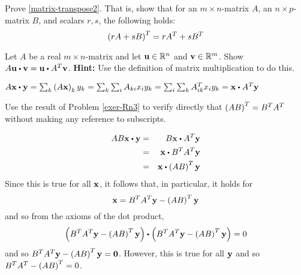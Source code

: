 \begin{enumialphparenastyle}
\begin{ex} Prove \ref{matrix-transpose2}. That is, show that for an $m \times n$-matrix $A$, an $n \times p$-matrix $B$, and scalars $r, s$, the following holds:
\[
\left(rA + sB\right) ^T = rA^{T} + sB^{T}
\]
\end{ex}

\begin{ex} \label{exer-Rn3}  Let $A$ be a real $m\times n$-matrix and
let $\mbox{\bf u}\in \mathbb{R}^{n}$ and $\mbox{\bf v}\in \mathbb{R}^{m}$. Show 
$A\vect{u}\dotprod \vect{v}=\vect{u}\dotprod A^{T}\vect{v}$. 
\textbf{Hint:} Use the definition of matrix
multiplication to do this.
\begin{sol}
$A\vect{x}\dotprod \vect{y}=\sum_{k}\tup{A\vect{x}
} _{k}y_{k}=\sum_{k}\sum_{i}A_{ki}x_{i}y_{k}=\sum_{i}
\sum_{k}A_{ik}^{T}x_{i}y_{k}= \vect{x} \dotprod A^{T}\vect{y} $
\end{sol}
\end{ex}

\begin{ex} Use the result of Problem \ref{exer-Rn3} to verify directly
that $\left(AB\right) ^{T}=B^{T}A^{T}$ without making any reference to
subscripts.
\begin{sol}
\begin{eqnarray*}
 AB\vect{x} \dotprod \vect{y} &=& B\vect{x} \dotprod A^{T}\vect{y} \\ 
&=& \vect{x}\dotprod B^{T}A^{T}\vect{y} \\
&=& \vect{x}\dotprod \tup{AB} ^{T} \vect{y}
\end{eqnarray*}
Since this is true for all $\mbox{\bf x}$, it follows that, in particular, it
holds for
\[
\mbox{\bf x}=B^{T}A^{T}\mbox{\bf y}-\left(AB\right) ^{T}\mbox{\bf y}
\]
and so from the axioms of the dot product,
\[
\tup{B^{T}A^{T}\vect{y}-\tup{AB} ^{T}\vect{y}} \dotprod \tup{B^{T}A^{T}
\vect{y}-\tup{AB} ^{T}\vect{y}} =0
\]
and so $B^{T}A^{T}\mbox{\bf y}-\left(AB\right) ^{T}\mbox{\bf y}=\mbox{\bf 0}$. However,
this is true for all $\mbox{\bf y}$ and so $B^{T}A^{T}-\left(
AB\right) ^{T}=0$.
\end{sol}
\end{ex}
 
\end{enumialphparenastyle}
